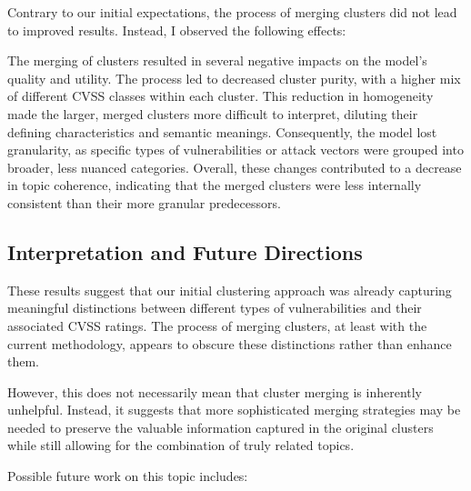 \documentclass[12pt]{article}
\begin{document}


Contrary to our initial expectations, the process of merging clusters did not lead to improved
results. Instead, I observed the following effects:

The merging of clusters resulted in several negative impacts on the model's quality and utility. The
process led to decreased cluster purity, with a higher mix of different CVSS classes within each
cluster. This reduction in homogeneity made the larger, merged clusters more difficult to interpret,
diluting their defining characteristics and semantic meanings. Consequently, the model lost
granularity, as specific types of vulnerabilities or attack vectors were grouped into broader, less
nuanced categories. Overall, these changes contributed to a decrease in topic coherence, indicating
that the merged clusters were less internally consistent than their more granular predecessors.


\subsection{Interpretation and Future Directions}

These results suggest that our initial clustering approach was already capturing meaningful
distinctions between different types of vulnerabilities and their associated CVSS ratings. The
process of merging clusters, at least with the current methodology, appears to obscure these
distinctions rather than enhance them.

However, this does not necessarily mean that cluster merging is inherently unhelpful. Instead, it
suggests that more sophisticated merging strategies may be needed to preserve the valuable
information captured in the original clusters while still allowing for the combination of truly
related topics.

Possible future work on this topic includes:
\end{document}
